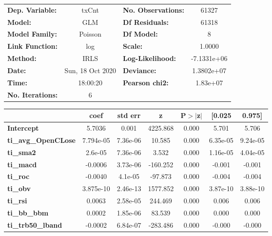 \begin{center}
\begin{tabular}{lclc}
\toprule
\textbf{Dep. Variable:}     &      txCnt       & \textbf{  No. Observations:  } &     61327    \\
\textbf{Model:}             &       GLM        & \textbf{  Df Residuals:      } &     61318    \\
\textbf{Model Family:}      &     Poisson      & \textbf{  Df Model:          } &         8    \\
\textbf{Link Function:}     &       log        & \textbf{  Scale:             } &     1.0000   \\
\textbf{Method:}            &       IRLS       & \textbf{  Log-Likelihood:    } & -7.1331e+06  \\
\textbf{Date:}              & Sun, 18 Oct 2020 & \textbf{  Deviance:          } &  1.3802e+07  \\
\textbf{Time:}              &     18:00:20     & \textbf{  Pearson chi2:      } &   1.83e+07   \\
\textbf{No. Iterations:}    &        6         & \textbf{                     } &              \\
\bottomrule
\end{tabular}
\begin{tabular}{lcccccc}
                            & \textbf{coef} & \textbf{std err} & \textbf{z} & \textbf{P$> |$z$|$} & \textbf{[0.025} & \textbf{0.975]}  \\
\midrule
\textbf{Intercept}          &       5.7036  &        0.001     &  4225.868  &         0.000        &        5.701    &        5.706     \\
\textbf{ti\_avg\_OpenCLose} &    7.794e-05  &     7.36e-06     &    10.585  &         0.000        &     6.35e-05    &     9.24e-05     \\
\textbf{ti\_sma2}           &      2.6e-05  &     7.36e-06     &     3.532  &         0.000        &     1.16e-05    &     4.04e-05     \\
\textbf{ti\_macd}           &      -0.0006  &     3.73e-06     &  -160.252  &         0.000        &       -0.001    &       -0.001     \\
\textbf{ti\_roc}            &      -0.0040  &      4.1e-05     &   -97.873  &         0.000        &       -0.004    &       -0.004     \\
\textbf{ti\_obv}            &    3.875e-10  &     2.46e-13     &  1577.852  &         0.000        &     3.87e-10    &     3.88e-10     \\
\textbf{ti\_rsi}            &       0.0063  &     2.58e-05     &   244.469  &         0.000        &        0.006    &        0.006     \\
\textbf{ti\_bb\_bbm}        &       0.0002  &     1.85e-06     &    83.539  &         0.000        &        0.000    &        0.000     \\
\textbf{ti\_trb50\_lband}   &      -0.0002  &     6.84e-07     &  -283.486  &         0.000        &       -0.000    &       -0.000     \\
\bottomrule
\end{tabular}
\end{center}


